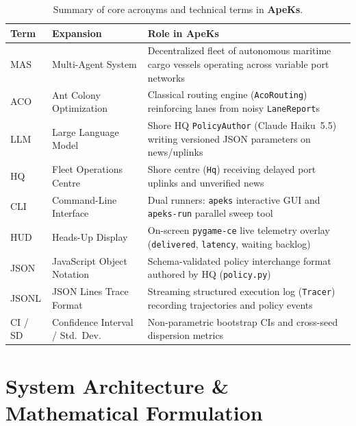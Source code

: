 \documentclass[11pt,a4paper,oneside]{report}
\begin{document}
\begin{table}[H]
\centering
\caption[Core acronyms and terminology summary]{Summary of core acronyms and technical terms in \textbf{ApeKs}.}
\label{tab:acronyms}
\begin{tabularx}{\textwidth}{@{}ll>{\raggedright\arraybackslash}X@{}}
\toprule
\textbf{Term} & \textbf{Expansion} & \textbf{Role in ApeKs} \\
\midrule
MAS & Multi-Agent System & Decentralized fleet of autonomous maritime cargo vessels operating across variable port networks \\
ACO & Ant Colony Optimization & Classical routing engine (\texttt{AcoRouting}) reinforcing lanes from noisy \texttt{LaneReport}s \\
LLM & Large Language Model & Shore HQ \texttt{PolicyAuthor} (Claude Haiku~5.5) writing versioned JSON parameters on news/uplinks \\
HQ & Fleet Operations Centre & Shore centre (\texttt{Hq}) receiving delayed port uplinks and unverified news \\
CLI & Command-Line Interface & Dual runners: \texttt{apeks} interactive GUI and \texttt{apeks-run} parallel sweep tool \\
HUD & Heads-Up Display & On-screen \texttt{pygame-ce} live telemetry overlay (\texttt{delivered}, \texttt{latency}, waiting backlog) \\
JSON & JavaScript Object Notation & Schema-validated policy interchange format authored by HQ (\texttt{policy.py}) \\
JSONL & JSON Lines Trace Format & Streaming structured execution log (\texttt{Tracer}) recording trajectories and policy events \\
CI / SD & Confidence Interval / Std.\ Dev. & Non-parametric bootstrap CIs and cross-seed dispersion metrics \\
\bottomrule
\end{tabularx}
\end{table}

\chapter[Problem Formulation]{System Architecture \& Mathematical Formulation}
\label{cp:problem}

\parindent0pt
\end{document}
